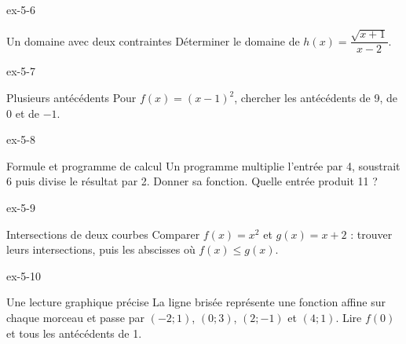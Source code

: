 \clearpage{}
\begin{blocLivre}{ex-5-6}
\begin{exercice}[2]{Un domaine avec deux contraintes}
Déterminer le domaine de $h(x)=\dfrac{\sqrt{x+1}}{x-2}$.
\end{exercice}
\end{blocLivre}
\begin{blocLivre}{ex-5-7}
\begin{exercice}[2]{Plusieurs antécédents}
Pour $f(x)=(x-1)^2$, chercher les antécédents de 9, de 0 et de $-1$.
\label{fig-ex-5-7}
\end{exercice}
\end{blocLivre}
\begin{blocLivre}{ex-5-8}
\begin{exercice}[2]{Formule et programme de calcul}
Un programme multiplie l’entrée par 4, soustrait 6 puis divise le résultat par 2. Donner sa fonction. Quelle entrée produit 11 ?
\end{exercice}
\end{blocLivre}
\begin{blocLivre}{ex-5-9}
\begin{exercice}[2]{Intersections de deux courbes}
Comparer $f(x)=x^2$ et $g(x)=x+2$ : trouver leurs intersections, puis les abscisses où $f(x)\le g(x)$.
\label{fig-ex-5-9}
\end{exercice}
\end{blocLivre}
\begin{blocLivre}{ex-5-10}
\begin{exercice}[2]{Une lecture graphique précise}
La ligne brisée représente une fonction affine sur chaque morceau et passe par $(-2;1)$, $(0;3)$, $(2;-1)$ et $(4;1)$. Lire $f(0)$ et tous les antécédents de 1.
\label{fig-ex-5-10}
\end{exercice}
\end{blocLivre}

